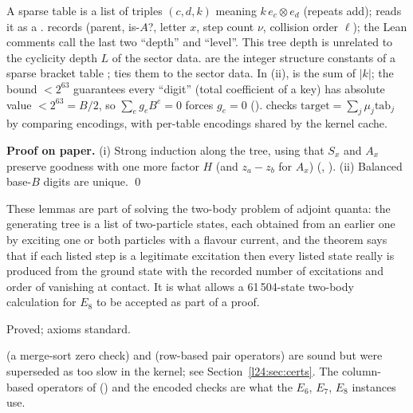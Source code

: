 \begin{dictionary}
A sparse table  is a list of triples $(c,d,k)$ meaning $k\,e_c\otimes e_d$ (repeats add);  reads it
as a .  records (parent, is-$A$?, letter $x$, step count $\nu$, collision order $\ell$); the Lean comments call the last two
``depth'' and ``level''. This tree depth is unrelated to the cyclicity depth $L$ of the sector data.  are the integer
structure constants of a sparse bracket table ;  ties them to the sector data. In (ii),
 is the sum of $|k|$; the bound $<2^{63}$ guarantees every ``digit'' (total coefficient of a key) has
absolute value $<2^{63}=B/2$, so $\sum_eg_eB^e=0$ forces $g_e=0$ ().  checks
$\mathrm{target}=\sum_j\mu_j\mathrm{tab}_j$ by comparing encodings, with per-table encodings shared by the kernel cache.
\end{dictionary}

\textbf{Proof on paper.} (i) Strong induction along the tree, using that $S_x$ and $A_x$ preserve goodness with one more
factor $H$ (and $z_a-z_b$ for $A_x$) (, ). (ii) Balanced base-$B$ digits are unique. \qed

\begin{physics}
These lemmas are part of solving the two-body problem of adjoint quanta: the generating tree is a list of two-particle
states, each obtained from an earlier one by exciting one or both particles with a flavour current, and the theorem says
that if each listed step is a legitimate excitation then every listed state really is produced from the ground state with
the recorded number of excitations and order of vanishing at contact. It is what allows a 61\,504-state two-body
calculation for $E_8$ to be accepted as part of a proof.
\end{physics}

\begin{status}
Proved; axioms standard.
\end{status}

\begin{warning}[title={Superseded checkers}]
 (a merge-sort zero check) and  (row-based pair
operators) are sound but were superseded as too slow in the kernel; see Section~\ref{l24:sec:certs}. The column-based
operators of  () and the encoded checks are what the $E_6$, $E_7$,
$E_8$ instances use.
\end{warning}

